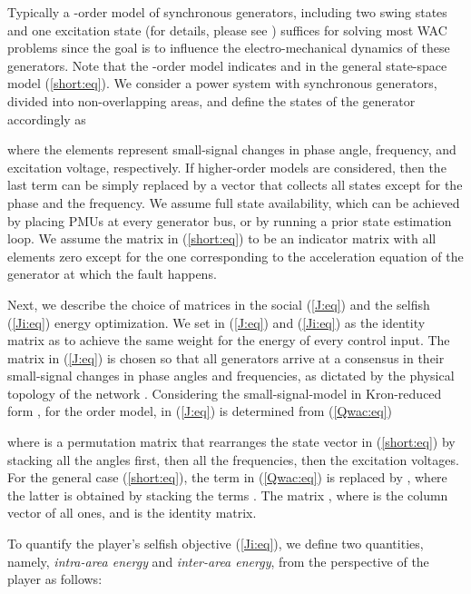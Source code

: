 \documentclass[12pt, draftclsnofoot,onecolumn]{IEEEtran}
\begin{document}
Typically a -order model of synchronous generators, including two swing states and one excitation state (for details, please see \cite{pramod}) suffices for solving most WAC problems since the goal is to influence the electro-mechanical dynamics of these generators. Note that the -order model indicates  and  in the general state-space model ({\ref{short:eq}}). We consider a power system with  synchronous generators, divided into  non-overlapping areas, and define the states of the  generator accordingly as

\noindent where the elements represent small-signal changes in phase angle, frequency, and excitation voltage, respectively. If higher-order models are considered, then the last term can be simply replaced by a vector  that collects all states except for the phase and the frequency. We assume full state availability, which can be achieved by placing PMUs at every generator bus, or by running a prior state estimation loop. We assume the matrix  in (\ref{short:eq}) to be an indicator matrix with all elements zero except for the one corresponding to the acceleration equation of the generator at which the fault  happens.



Next, we describe the choice of matrices in the social (\ref{J:eq}) and the selfish (\ref{Ji:eq}) energy optimization. We set  in (\ref{J:eq}) and  (\ref{Ji:eq}) as the identity matrix as to achieve the same weight for the energy of every control input. The matrix  in (\ref{J:eq}) is chosen so that all generators arrive at a consensus in their small-signal changes in phase angles and frequencies, as dictated by the physical topology of the network \cite{lianensuring,dorjovchebulTPS14}. Considering the small-signal-model in Kron-reduced form \cite{pramod}, for the  order model,  in (\ref{J:eq}) is determined from (\ref{Qwac:eq})


\noindent where  is a permutation matrix that rearranges the state vector  in (\ref{short:eq}) by stacking all the angles first, then all the frequencies, then the excitation voltages. For the general case (\ref{short:eq}), the  term in (\ref{Qwac:eq}) is replaced by , where the latter is obtained by stacking the terms . The matrix  \cite{Lian:aa}, where  is the column vector of all ones, and  is the identity matrix.

To quantify the  player's selfish objective (\ref{Ji:eq}), we define two quantities, namely, {\it intra-area energy} and {\it inter-area energy}, from the perspective of the  player as follows:
 
\end{document}

